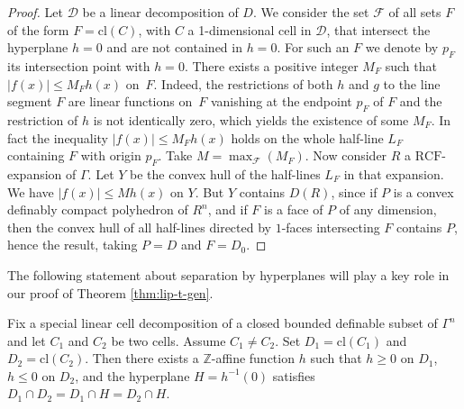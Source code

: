 \documentclass[JEP,XML,SOM,Unicode,ThmDefs,NoEqCountersInSection,published]{cedram}
\newcommand{\cl}{\mathrm{cl}}
\newcommand{\Z}{\mathbb Z}
\theoremstyle{plain}
\theoremstyle{definition}
\begin{document}
\begin{proof}Let $\mathcal{D}$ be a linear decomposition of $D$.
We consider the set $\mathcal{F}$ of all sets $F$ of the form $F = \cl (C)$, with $C$ a 1-dimensional cell in $\mathcal{D}$,
that intersect the hyperplane $h = 0$ and are not contained in $h=0$.
For such an $F$ we denote by $p_F$ its intersection point with $h = 0$.
There exists a positive integer $M_F$ such that
$\vert f (x) \vert \leq M_F h (x)$ on~$F$. Indeed,
the restrictions of both $h$ and $g$ to the line segment $F$ are linear functions on~$F$ vanishing at the endpoint $p_F$ of $F$ and the restriction of $h$ is not identically zero, which yields the existence of
some $M_F$.
In fact the inequality $\vert f (x) \vert \leq M_F h (x)$ holds on the whole half-line $L_F$ containing $F$ with origin $p_F$.
Take $M = \max_{\mathcal{F}} (M_F)$. Now consider $R$ a $\mathrm{RCF}$-expansion of $\Gamma$. Let $Y$ be the convex hull of the half-lines $L_F$ in that expansion. We have $\vert f (x) \vert \leq M h (x)$ on $Y$.
But $Y$ contains $D (R)$, since if $P$ is a convex definably compact polyhedron of $R^n$, and if $F$ is a face of $P$ of any dimension, then the convex hull of all half-lines directed by $1$-faces intersecting $F$ contains $P$,
hence the result, taking $P = D$ and $F = D_0$.
\end{proof}

The following statement about separation by hyperplanes will play a key role in our proof of Theorem \ref{thm:lip-t-gen}.

\begin{prop}\label{prop:cell}Fix a special linear cell decomposition of a closed bounded definable subset of $\Gamma^n$ and let $C_1$ and $C_2$ be two cells.
Assume $C_1 \neq C_2$. Set $D_1 = \cl (C_1)$ and
$D_2 = \cl (C_2)$. Then there exists a $\Z$-affine function $h$ such that $h \geq 0$ on $D_1$,
$h \leq 0$ on $D_2$, and
the hyperplane $H =h^{-1}(0)$ satisfies $D_1\cap D_2 =D_1 \cap H=D_2\cap H$.
\end{prop}
\end{document}
